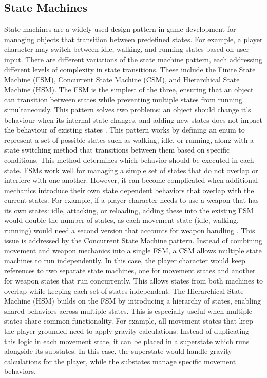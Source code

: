 \documentclass[]{final_report}
\begin{document}
\subsection{State Machines}\label{HSM}
\color{red} State machines are a widely used design pattern in game development for managing objects that transition between predefined states. For example, a player character may switch between idle, walking, and running states based on user input. There are different variations of the state machine pattern, each addressing different levels of complexity in state transitions. These include the Finite State Machine (FSM), Concurrent State Machine (CSM), and Hierarchical State Machine (HSM). The FSM is the simplest of the three, ensuring that an object can transition between states while preventing multiple states from running simultaneously. \color{black} This pattern solves two problems: an object should change it’s behaviour when its internal state changes, and adding new states does not impact the behaviour of existing states \cite{unity2022_patterns}. \color{red} This pattern works by defining an enum to represent a set of possible states such as walking, idle, or running, along with a state switching method that transitions between them based on specific conditions. This method determines which behavior should be executed in each state. FSMs work well for managing a simple set of states that do not overlap or interfere with one another. However, it can become complicated when additional mechanics introduce their own state dependent behaviors that overlap with the current states. For example, if a player character needs to use a weapon that has its own states: idle, attacking, or reloading, adding these into the existing FSM would double the number of states, as each movement state (idle, walking, running) would need a second version that accounts for weapon handling \cite{nystrom2011game}. \newline
This issue is addressed by the Concurrent State Machine pattern. Instead of combining movement and weapon mechanics into a single FSM, a CSM allows multiple state machines to run independently. In this case, the player character would keep references to two separate state machines, one for movement states and another for weapon states that run concurrently. This allows states from both machines to overlap while keeping each set of states independent.
The Hierarchical State Machine (HSM) builds on the FSM by introducing a hierarchy of states, enabling shared behaviors across multiple states. This is especially useful when multiple states share common functionality. For example, all movement states that keep the player grounded need to apply gravity calculations. Instead of duplicating this logic in each movement state, it can be placed in a superstate which runs alongside its substates. In this case, the superstate would handle gravity calculations for the player, while the substates manage specific movement behaviors. 
\end{document}
